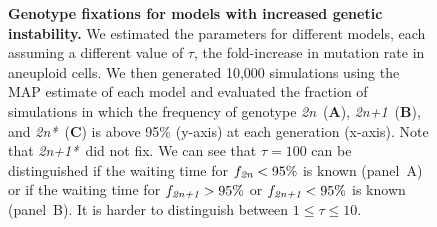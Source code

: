 \documentclass[12pt]{extarticle}
\newcommand{\euwt}{\emph{2n}}
\newcommand{\anwt}{\emph{2n+1}}
\newcommand{\eumt}{\emph{2n*}}
\newcommand{\anmt}{\emph{2n+1*}}
\begin{document}
\begin{figure}[p]
\begin{subfigure}{0.75\textwidth}
  \end{subfigure}
   \caption{
    \textbf{Genotype fixations for models with increased genetic instability.} We estimated the parameters for different models, each assuming a different value of $\tau$, the fold-increase in mutation rate in aneuploid cells. We then generated 10,000 simulations using the MAP estimate of each model and evaluated the fraction of simulations in which the frequency of genotype \euwt\ (\textbf{A}), \anwt\ (\textbf{B}), and \eumt\ (\textbf{C}) is above 95\% (y-axis) at each generation (x-axis). Note that \anmt\ did not fix. We can see that $\tau=100$ can be distinguished if the waiting time for $f_{\euwt}<95\%$ is known (panel~A) or if the waiting time for $f_{\anwt}>95\%$ or $f_{\anwt}<95\%$ is known (panel~B). It is harder to distinguish between $1\leq \tau \leq10$.
  }
  \label{fig:tau-plots}
\end{figure}
\end{document}
